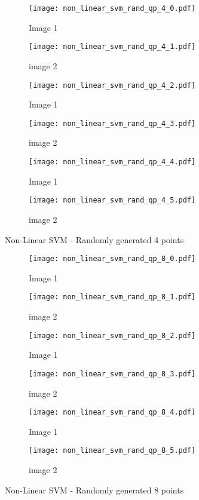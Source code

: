 \documentclass[10pt, a4paper,reqno]{amsart}
\begin{document}
\begin{figure}[H]
	\centering	
	\begin{subfigure}{0.5\textwidth}
		\centering
		\texttt{[image: non\_linear\_svm\_rand\_qp\_4\_0.pdf]}
		\caption{Image 1}
	\end{subfigure}%
	\begin{subfigure}{0.5\textwidth}
		\centering
		\texttt{[image: non\_linear\_svm\_rand\_qp\_4\_1.pdf]}
		\caption{image 2}
	\end{subfigure}
	\begin{subfigure}{0.5\textwidth}
		\centering
		\texttt{[image: non\_linear\_svm\_rand\_qp\_4\_2.pdf]}
		\caption{Image 1}
	\end{subfigure}%
	\begin{subfigure}{0.5\textwidth}
		\centering
		\texttt{[image: non\_linear\_svm\_rand\_qp\_4\_3.pdf]}
		\caption{image 2}
	\end{subfigure}
	\begin{subfigure}{0.5\textwidth}
		\centering
		\texttt{[image: non\_linear\_svm\_rand\_qp\_4\_4.pdf]}
		\caption{Image 1}
	\end{subfigure}%
	\begin{subfigure}{0.5\textwidth}
		\centering
		\texttt{[image: non\_linear\_svm\_rand\_qp\_4\_5.pdf]}
		\caption{image 2}
	\end{subfigure}
	\caption{Non-Linear SVM - Randomly generated 4 points}
\end{figure}

\begin{figure}[H]
	\centering	
	\begin{subfigure}{0.5\textwidth}
		\centering
		\texttt{[image: non\_linear\_svm\_rand\_qp\_8\_0.pdf]}
		\caption{Image 1}
	\end{subfigure}%
	\begin{subfigure}{0.5\textwidth}
		\centering
		\texttt{[image: non\_linear\_svm\_rand\_qp\_8\_1.pdf]}
		\caption{image 2}
	\end{subfigure}
	\begin{subfigure}{0.5\textwidth}
		\centering
		\texttt{[image: non\_linear\_svm\_rand\_qp\_8\_2.pdf]}
		\caption{Image 1}
	\end{subfigure}%
	\begin{subfigure}{0.5\textwidth}
		\centering
		\texttt{[image: non\_linear\_svm\_rand\_qp\_8\_3.pdf]}
		\caption{image 2}
	\end{subfigure}
	\begin{subfigure}{0.5\textwidth}
		\centering
		\texttt{[image: non\_linear\_svm\_rand\_qp\_8\_4.pdf]}
		\caption{Image 1}
	\end{subfigure}%
	\begin{subfigure}{0.5\textwidth}
		\centering
		\texttt{[image: non\_linear\_svm\_rand\_qp\_8\_5.pdf]}
		\caption{image 2}
	\end{subfigure}
	\caption{Non-Linear SVM - Randomly generated 8 points}
\end{figure}
\end{document}
